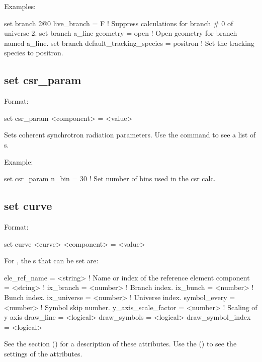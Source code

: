{{Examples:
\begin{example}
  set branch 2@0 live_branch = F     ! Suppress calculations for branch \# 0 of universe 2.
  set branch a_line geometry = open  ! Open geometry for branch named a_line.
  set branch default_tracking_species = positron
                                     ! Set the tracking species to positron.
\end{example}


\subsection{set csr_param}
\label{s:set.csr.param}

Format:
\begin{example}
  set csr_param <component> = <value>
\end{example}

Sets coherent synchrotron radiation parameters. Use the 
command to see a list of s.

Example:
\begin{example}
  set csr_param n_bin = 30  ! Set number of bins used in the csr calc.
\end{example}


\subsection{set curve}
\label{s:set.curve}

Format:
\begin{example}
  set curve <curve> <component> = <value>
\end{example}

For , the s that can be set are:
\begin{example}
  ele_ref_name        = <string>  ! Name or index of the reference element
  component           = <string>  ! 
  ix_branch           = <number>  ! Branch index.
  ix_bunch            = <number>  ! Bunch index.
  ix_universe         = <number>  ! Universe index.
  symbol_every        = <number>  ! Symbol skip number.
  y_axis_scale_factor = <number>  ! Scaling of y axis
  draw_line           = <logical> 
  draw_symbols        = <logical> 
  draw_symbol_index   = <logical> 
\end{example}
See the  section () for a description of these attributes.  Use
the  () to see the settings of the attributes.

}}
